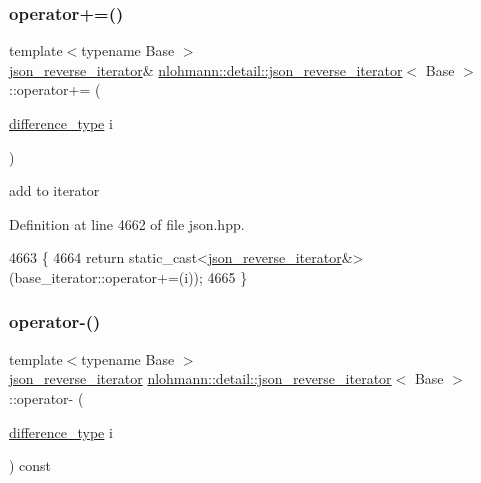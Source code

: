 \subsubsection{\texorpdfstring{operator+=()}{operator+=()}}
{\footnotesize\ttfamily template$<$typename Base $>$ \\
\hyperlink{classnlohmann_1_1detail_1_1json__reverse__iterator}{json\+\_\+reverse\+\_\+iterator}\& \hyperlink{classnlohmann_1_1detail_1_1json__reverse__iterator}{nlohmann\+::detail\+::json\+\_\+reverse\+\_\+iterator}$<$ Base $>$\+::operator+= (\begin{DoxyParamCaption}\item[{\hyperlink{classnlohmann_1_1detail_1_1json__reverse__iterator_a9ab55987c05ec6427ad36082e351cc45}{difference\+\_\+type}}]{i }\end{DoxyParamCaption})\hspace{0.3cm}{\ttfamily [inline]}}



add to iterator 



Definition at line 4662 of file json.\+hpp.


\begin{DoxyCode}
4663     \{
4664         \textcolor{keywordflow}{return} \textcolor{keyword}{static\_cast<}\hyperlink{classnlohmann_1_1detail_1_1json__reverse__iterator_a0246de16ece16293f2917dfa5d96e278}{json\_reverse\_iterator}&\textcolor{keyword}{>}(base\_iterator::operator+=(i));
4665     \}
\end{DoxyCode}
\mbox{\label{classnlohmann_1_1detail_1_1json__reverse__iterator_a549c6eb10b6434eaf772f71d129a6d79}} 
\subsubsection{\texorpdfstring{operator-\/()}{operator-()}\hspace{0.1cm}{\footnotesize\ttfamily [1/2]}}
{\footnotesize\ttfamily template$<$typename Base $>$ \\
\hyperlink{classnlohmann_1_1detail_1_1json__reverse__iterator}{json\+\_\+reverse\+\_\+iterator} \hyperlink{classnlohmann_1_1detail_1_1json__reverse__iterator}{nlohmann\+::detail\+::json\+\_\+reverse\+\_\+iterator}$<$ Base $>$\+::operator-\/ (\begin{DoxyParamCaption}\item[{\hyperlink{classnlohmann_1_1detail_1_1json__reverse__iterator_a9ab55987c05ec6427ad36082e351cc45}{difference\+\_\+type}}]{i }\end{DoxyParamCaption}) const\hspace{0.3cm}{\ttfamily [inline]}}



